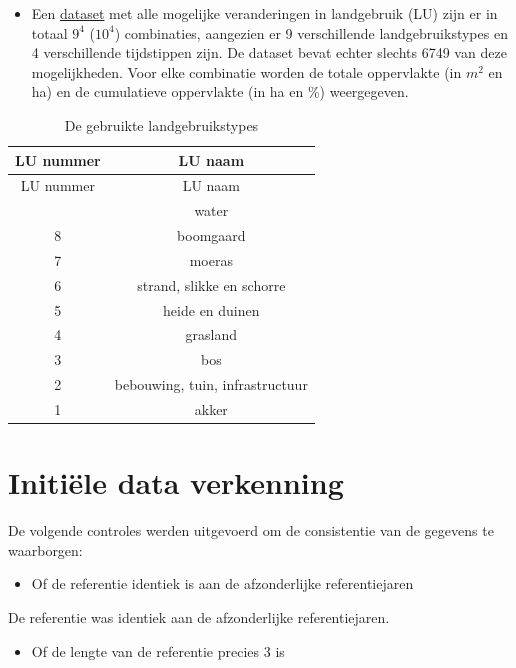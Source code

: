 \documentclass[twoside]{extreport}
\providecommand{\tightlist}{%
  \setlength{\itemsep}{0pt}\setlength{\parskip}{0pt}}\usepackage{longtable,booktabs,array}
\begin{document}
\begin{itemize}
\tightlist
\item
  Een
  \href{https://docs.google.com/spreadsheets/d/1yI-kd37vwDwbLmGGfeZnF1-fiEj1Gzot/edit?gid=1403611980\#gid=1403611980}{dataset}
  met alle mogelijke veranderingen in landgebruik (LU) zijn er in totaal
  \(9^4\) (\ensuremath{10^{4}}) combinaties, aangezien er 9
  verschillende landgebruikstypes en 4 verschillende tijdstippen zijn.
  De dataset bevat echter slechts 6749 van deze mogelijkheden. Voor elke
  combinatie worden de totale oppervlakte (in \(m^2\) en ha) en de
  cumulatieve oppervlakte (in ha en \%) weergegeven.
\end{itemize}

\begin{longtable}[]{@{}cc@{}}
\caption{De gebruikte landgebruikstypes}\tabularnewline
\toprule\noalign{}
LU nummer & LU naam \\
\midrule\noalign{}
\endfirsthead
\toprule\noalign{}
LU nummer & LU naam \\
\midrule\noalign{}
\endhead
\bottomrule\noalign{}
\endlastfoot
9 & water \\
8 & boomgaard \\
7 & moeras \\
6 & strand, slikke en schorre \\
5 & heide en duinen \\
4 & grasland \\
3 & bos \\
2 & bebouwing, tuin, infrastructuur \\
1 & akker \\
\end{longtable}

\section{Initiële data verkenning}\label{initiuxeble-data-verkenning}

De volgende controles werden uitgevoerd om de consistentie van de
gegevens te waarborgen:

\begin{itemize}
\tightlist
\item
  Of de referentie identiek is aan de afzonderlijke referentiejaren
\end{itemize}

De referentie was identiek aan de afzonderlijke referentiejaren.

\begin{itemize}
\tightlist
\item
  Of de lengte van de referentie precies 3 is
\end{itemize}
\end{document}
